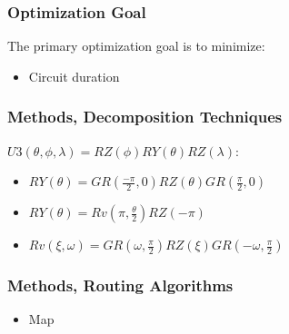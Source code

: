 \documentclass[18 pt]{beamer}
\begin{document}
\begin{frame}
    \frametitle{Optimization Goal}
    The primary optimization goal is to minimize:
    \begin{itemize}
        \item Circuit duration 
    \end{itemize}
\end{frame}

\begin{frame}
    \frametitle{Methods, \textbf{Decomposition Techniques}}
    $U3(\theta,\phi,\lambda)= RZ(\phi)RY(\theta)RZ(\lambda)$:
    \begin{itemize}
        \item $RY(\theta)= GR(\frac{-\pi}{2},0)RZ(\theta)GR(\frac{\pi}{2},0)$
        \item $RY(\theta) = Rv(\pi,\frac{\theta}{2})RZ(-\pi)$
        \item $Rv(\xi,\omega)=GR(\omega,\frac{\pi}{2})RZ(\xi)GR(-\omega,\frac{\pi}{2})$
    \end{itemize}
\end{frame}

\begin{frame}
    \frametitle{Methods, \textbf{Routing Algorithms}}
    \begin{itemize}
        \item Map
    \end{itemize}
\end{frame}


\end{document}

